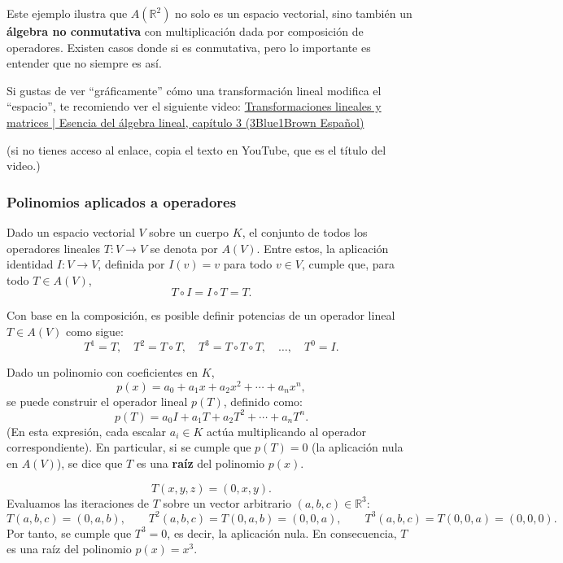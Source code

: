 Este ejemplo ilustra que \(A(\mathbb{R}^2)\) no solo es un espacio vectorial, sino también un \textbf{álgebra no conmutativa} con multiplicación dada por composición de operadores. Existen casos donde si es conmutativa, pero lo importante es entender que no siempre es así.

Si gustas de ver ``gráficamente'' cómo una transformación lineal modifica el ``espacio'', te recomiendo ver el siguiente video: \href{https://www.youtube.com/watch?v=YJfS4_m_0Z8}{Transformaciones lineales y matrices | Esencia del álgebra lineal, capítulo 3 (3Blue1Brown Español)} 

(si no tienes acceso al enlace, copia el texto en YouTube, que es el título del video.)

\subsubsection{Polinomios aplicados a operadores}

Dado un espacio vectorial \(V\) sobre un cuerpo \(K\), el conjunto de todos los operadores lineales \(T: V \rightarrow V\) se denota por \(A(V)\). Entre estos, la aplicación identidad \(I: V \rightarrow V\), definida por \(I(v) = v\) para todo \(v \in V\), cumple que, para todo \(T \in A(V)\),
\[
  T \circ I = I \circ T = T.
\]

Con base en la composición, es posible definir potencias de un operador lineal \(T \in A(V)\) como sigue:
\[
  T^1 = T,\quad T^2 = T \circ T,\quad T^3 = T \circ T \circ T,\quad \ldots,\quad T^0 = I.
\]

Dado un polinomio con coeficientes en \(K\),
\[
  p(x) = a_0 + a_1 x + a_2 x^2 + \cdots + a_n x^n,
\]
se puede construir el operador lineal \(p(T)\), definido como:
\[
  p(T) = a_0 I + a_1 T + a_2 T^2 + \cdots + a_n T^n.
\]
(En esta expresión, cada escalar \(a_i \in K\) actúa multiplicando al operador correspondiente). En particular, si se cumple que \(p(T) = 0\) (la aplicación nula en \(A(V)\)), se dice que \(T\) es una \textbf{raíz} del polinomio \(p(x)\).

\[
  T(x, y, z) = (0, x, y).
\]
Evaluamos las iteraciones de \(T\) sobre un vector arbitrario \((a, b, c) \in \mathbb{R}^3\):
\[
  T(a, b, c) = (0, a, b), \qquad T^2(a, b, c) = T(0, a, b) = (0, 0, a), \qquad T^3(a, b, c) = T(0, 0, a) = (0, 0, 0).
\]
Por tanto, se cumple que \(T^3 = 0\), es decir, la aplicación nula. En consecuencia, \(T\) es una raíz del polinomio \(p(x) = x^3\).